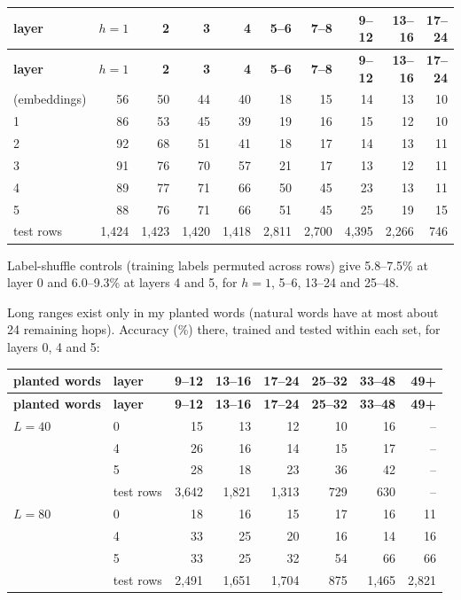 \documentclass[paper=a4,fontsize=11pt,DIV=11,parskip=half,headings=small,numbers=noendperiod]{scrartcl}
\DeclareRobustCommand{\hdr}[1]{\textsf{\bfseries #1}}
\begin{document}
{\small\nopagebreak[4]
\begin{longtable}{@{}l *{9}{r}@{}}
\toprule
\hdr{layer} & \hdr{$h=1$} & \hdr{2} & \hdr{3} & \hdr{4} & \hdr{5–6} & \hdr{7–8} & \hdr{9–12} & \hdr{13–16} & \hdr{17–24} \\
\midrule
\endfirsthead
\toprule
\hdr{layer} & \hdr{$h=1$} & \hdr{2} & \hdr{3} & \hdr{4} & \hdr{5–6} & \hdr{7–8} & \hdr{9–12} & \hdr{13–16} & \hdr{17–24} \\
\midrule
\endhead
\bottomrule
\endlastfoot
0 (embeddings) & 56 & 50 & 44 & 40 & 18 & 15 & 14 & 13 & 10 \\
1 & 86 & 53 & 45 & 39 & 19 & 16 & 15 & 12 & 10 \\
2 & 92 & 68 & 51 & 41 & 18 & 17 & 14 & 13 & 11 \\
3 & 91 & 76 & 70 & 57 & 21 & 17 & 13 & 12 & 11 \\
4 & 89 & 77 & 71 & 66 & 50 & 45 & 23 & 13 & 11 \\
5 & 88 & 76 & 71 & 66 & 51 & 45 & 25 & 19 & 15 \\
test rows & 1,424 & 1,423 & 1,420 & 1,418 & 2,811 & 2,700 & 4,395 & 2,266 & 746 \\
\end{longtable}}

Label-shuffle controls (training labels permuted across rows) give 5.8–7.5\% at layer 0 and 6.0–9.3\% at layers
4 and 5, for $h=1$, 5–6, 13–24 and 25–48.

Long ranges exist only in my planted words (natural words have at most about 24 remaining hops). Accuracy (\%)
there, trained and tested within each set, for layers 0, 4 and 5:

{\small\nopagebreak[4]
\begin{longtable}{@{}l l *{6}{r}@{}}
\toprule
\hdr{planted words} & \hdr{layer} & \hdr{9–12} & \hdr{13–16} & \hdr{17–24} & \hdr{25–32} & \hdr{33–48} & \hdr{49+} \\
\midrule
\endfirsthead
\toprule
\hdr{planted words} & \hdr{layer} & \hdr{9–12} & \hdr{13–16} & \hdr{17–24} & \hdr{25–32} & \hdr{33–48} & \hdr{49+} \\
\midrule
\endhead
\bottomrule
\endlastfoot
$L=40$ & 0 & 15 & 13 & 12 & 10 & 16 & – \\
 & 4 & 26 & 16 & 14 & 15 & 17 & – \\
 & 5 & 28 & 18 & 23 & 36 & 42 & – \\
 & test rows & 3,642 & 1,821 & 1,313 & 729 & 630 & – \\
$L=80$ & 0 & 18 & 16 & 15 & 17 & 16 & 11 \\
 & 4 & 33 & 25 & 20 & 16 & 14 & 16 \\
 & 5 & 33 & 25 & 32 & 54 & 66 & 66 \\
 & test rows & 2,491 & 1,651 & 1,704 & 875 & 1,465 & 2,821 \\
\end{longtable}}
\end{document}
